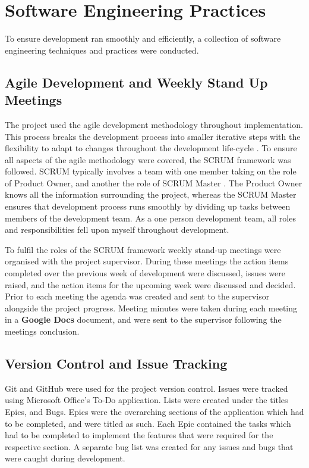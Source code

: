 \documentclass{l4proj}
\begin{document}
\section{Software Engineering Practices}
To ensure development ran smoothly and efficiently, a collection of software engineering techniques and practices were conducted.

\subsection{Agile Development and Weekly Stand Up Meetings}
The project used the agile development methodology throughout implementation. This process breaks the development process into smaller iterative steps with the flexibility to adapt to changes throughout the development life-cycle \citep{Atlassian}. To ensure all aspects of the agile methodology were covered, the SCRUM framework was followed. SCRUM typically involves a team with one member taking on the role of Product Owner, and another the role of SCRUM Master \citep{Scrum.org}. The Product Owner knows all the information surrounding the project, whereas the SCRUM Master ensures that development process runs smoothly by dividing up tasks between members of the development team. As a one person development team, all roles and responsibilities fell upon myself throughout development.

To fulfil the roles of the SCRUM framework weekly stand-up meetings were organised with the project supervisor. During these meetings the action items completed over the previous week of development were discussed, issues were raised, and the action items for the upcoming week were discussed and decided. Prior to each meeting the agenda was created and sent to the supervisor alongside the project progress. Meeting minutes were taken during each meeting in a \textbf{Google Docs} document, and were sent to the supervisor following the meetings conclusion.

\subsection{Version Control and Issue Tracking}
Git and GitHub were used for the project version control. Issues were tracked using Microsoft Office's To-Do application. Lists were created under the titles Epics, and Bugs. Epics were the overarching sections of the application which had to be completed, and were titled as such. Each Epic contained the tasks which had to be completed to implement the features that were required for the respective section. A separate bug list was created for any issues and bugs that were caught during development.
\end{document}
